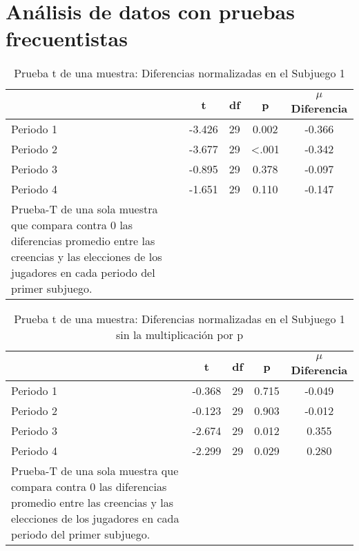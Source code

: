 
\chapter{Análisis de datos con pruebas frecuentistas} %

\label{App_Data} %



\begin{table}[h]
\caption[Prueba t de una muestra: Diferencias normalizadas en el Subjuego 1]{Prueba t de una muestra: Diferencias normalizadas en el Subjuego 1}
\label{DN-S1}
\centering
\begin{tabular}{l | c c c | c}
\toprule
\textbf{} & \textbf{t} & \textbf{df} & \textbf{p} & \textbf{$\mu$Diferencia}\\
\midrule
Periodo 1 & -3.426 & 29 & 0.002 & -0.366\\
Periodo 2 & -3.677 & 29 & <.001 & -0.342\\
Periodo 3 & -0.895 & 29 & 0.378 & -0.097\\
Periodo 4 & -1.651 & 29 & 0.110 & -0.147\\
\bottomrule
Prueba-T de una sola muestra que compara contra 0 las diferencias promedio entre las creencias y las elecciones de los jugadores en cada periodo del primer subjuego.
\end{tabular}
\end{table}







\begin{table}[h]
\caption[Prueba t de una muestra: Diferencias normalizadas en el Subjuego 1 sin la multiplicación por p]{Prueba t de una muestra: Diferencias normalizadas en el Subjuego 1 sin la multiplicación por p}
\label{DN-S1}
\centering
\begin{tabular}{l | c c c | c}
\toprule
\textbf{} & \textbf{t} & \textbf{df} & \textbf{p} & \textbf{$\mu$Diferencia}\\
\midrule
Periodo 1 & -0.368 & 29 & 0.715 & -0.049\\
Periodo 2 & -0.123 & 29 & 0.903 & -0.012\\
Periodo 3 & -2.674 & 29 & 0.012 & 0.355\\
Periodo 4 & -2.299 & 29 & 0.029 & 0.280\\
\bottomrule
Prueba-T de una sola muestra que compara contra 0 las diferencias promedio entre las creencias y las elecciones de los jugadores en cada periodo del primer subjuego.
\end{tabular}
\end{table}










